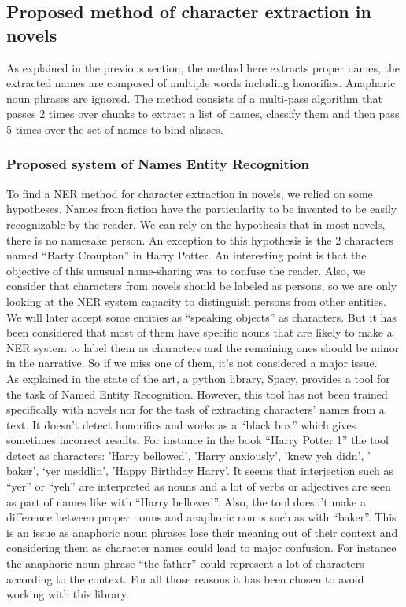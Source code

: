 \documentclass[a4paper, 12pt]{report}
\begin{document}
\subsection{Proposed method of character extraction in novels}
As explained in the previous section, the method here extracts proper names, the extracted names are composed of multiple words including honorifics.
Anaphoric noun phrases are ignored.
The method consists of a multi-pass algorithm that passes 2 times over chunks to extract a list of names, classify them and then pass 5 times over the set of names to bind aliases.

\subsubsection{Proposed system of Names Entity Recognition}
\label{section:NER}
To find a NER method for character extraction in novels, we relied on some hypotheses.
Names from fiction have the particularity to be invented to be easily recognizable by the reader.
We can rely on the hypothesis that in most novels, there is no namesake person. An exception to this hypothesis is the 2 characters named ``Barty Croupton'' in Harry Potter.
An interesting point is that the objective of this unusual name-sharing was to confuse the reader.
Also, we consider that characters from novels should be labeled as persons, so we are only looking at the NER system capacity to distinguish persons from other entities.
We will later accept some entities as ``speaking objects'' as characters.
But it has been considered that most of them have specific nouns that are likely to make a NER system to label them as characters
and the remaining ones should be minor in the narrative. So if we miss one of them, it's not considered a major issue.\\

As explained in the state of the art, a python library, Spacy, provides a tool for the task of Named Entity Recognition.
However, this tool has not been trained specifically with novels nor for the task of extracting characters' names from a text.
It doesn't detect honorifics and works as a ``black box'' which gives sometimes incorrect results.
For instance in the book ``Harry Potter 1'' the tool detect as characters: 'Harry bellowed', 'Harry anxiously', 'knew yeh didn', ' baker', `yer meddlin', 'Happy Birthday Harry'.
It seems that interjection such as ``yer'' or ``yeh'' are interpreted as nouns and a lot of verbs or adjectives are seen as part of names like with ``Harry bellowed''.
Also, the tool doesn't make a difference between proper nouns and anaphoric nouns such as with ``baker''.
This is an issue as anaphoric noun phrases lose their meaning out of their context and considering them as character names could lead to major confusion.
For instance the anaphoric noun phrase ``the father'' could represent a lot of characters according to the context.
For all those reasons it has been chosen to avoid working with this library. \\
\end{document}

